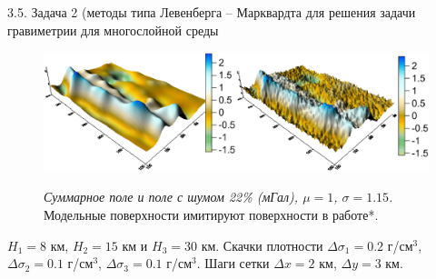 \documentclass[10pt,pdf, mathserif, hyperref={unicode}]{beamer}
\begin{document}
\begin{frame}{\small 3.5. Задача 2 (методы типа Левенберга -- Марквардта для решения задачи гравиметрии для многослойной среды}
	\begin{figure}
		\centering
		\includegraphics[height=0.3\textheight]{fields}
		
		\centering\textit{Суммарное поле и поле с шумом 22\% (мГал), $\mu=1$, $\sigma=1.15$.}
\flushleft
Модельные поверхности имитируют поверхности в работе*.
%		
	\end{figure}
%	
	$H_1=8$ км, $H_2=15$ км и $H_3=30$ км. Скачки плотности $\Delta\sigma_1=0.2$ г/см$^3$, $\Delta\sigma_2=0.1$ г/см$^3$, $\Delta\sigma_3=0.1$ г/см$^3$. Шаги сетки $\Delta x=2$ км, $\Delta y=3$ км.

	\let\thefootnote\relax\let\thefootnote\relax{}

	\let\thefootnote\relax\let\thefootnote\relax{}

\end{frame}
\end{document}
